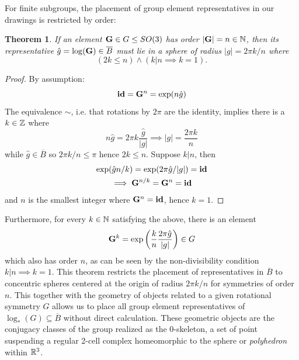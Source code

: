 \documentclass{amsart}
\theoremstyle{plain}
\newtheorem{theorem}{Theorem}
\theoremstyle{definition}
\begin{document}
    For finite subgroups, the placement of group element representatives in our drawings is restricted by order:
    \begin{theorem}\label{thm:sphereclass}
        If an element $\mathbf{G}\in G\leq SO(3)$ has order $\left|\mathbf{G}\right|=n\in\mathbb{N}$, then its representative $\hat{g}=\log(\mathbf{G})\in \overline{B}$ must lie in a sphere of radius $|g|=2\pi k/n$ where 
        \begin{equation*}
            (2k\leq n)\land (k|n\implies k=1).
        \end{equation*}
    \end{theorem}
    \begin{proof}
    By assumption:
    \begin{equation}
        \mathbf{id} = \mathbf{G}^n = \exp(n\hat{g})
    \end{equation}
    The equivalence $\sim$, i.e. that rotations by $2\pi$ are the identity, implies there is a $k\in\mathbb{Z}$ where
    \begin{equation}
        n\hat{g}=2\pi k\frac{\hat{g}}{|g|}\implies |g|=\frac{2\pi k}{n}
    \end{equation}
    while $\hat{g}\in \overline{B}$ so $2\pi k/n\leq \pi$ hence $2k\leq n$. Suppose $k|n$, then
    \begin{gather}
        \exp(\hat{g}n/k)=\exp(2\pi \hat{g}/|g|)=\mathbf{id}\\
        \implies\mathbf{G}^{n/k}=\mathbf{G}^n=\mathbf{id}
    \end{gather} and $n$ is the smallest integer where $\mathbf{G}^n=\mathbf{id}$, hence $k = 1$.
    \end{proof}
    Furthermore, for every $k\in \mathbb{N}$ satisfying the above, there is an element
        \begin{equation*}
            \mathbf{G}^k=\exp\left(\frac{k}{n}\frac{2\pi \hat{g}}{\left|g\right|}\right)\in G
        \end{equation*}
    which also has order $n$, as can be seen by the non-divisibility condition $k|n\implies k=1$.
    This theorem restricts the placement of representatives in $\overline{B}$ to concentric spheres centered at the origin of radius $2\pi k/n$ for symmetries of order $n$. This together with the geometry of objects related to a given rotational symmetry $G$ allows us to place all group element representatives of $\log_*(G)\subseteq \overline{B}$ without direct calculation. These geometric objects are the conjugacy classes of the group realized as the 0-skeleton, a set of point suspending a regular 2-cell complex homeomorphic to the sphere or \emph{polyhedron} within $\mathbb{R}^3$.
    
\end{document}
